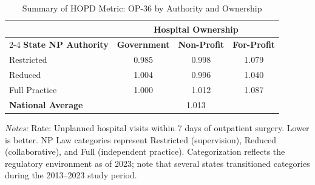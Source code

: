 \begin{table}[htbp]
    \centering
    \caption{Summary of HOPD Metric: OP-36 by Authority and Ownership}
    \label{tab:hopd_op_36}
    \vspace{0.2cm}
    \begin{tabular}{lccc}
        \toprule
        & \multicolumn{3}{c}{\textbf{Hospital Ownership}} \\
        \cmidrule(lr){2-4}
        \textbf{State NP Authority} & \textbf{Government} & \textbf{Non-Profit} & \textbf{For-Profit} \\
        \midrule
        Restricted & 0.985 & 0.998 & 1.079 \\
        Reduced & 1.004 & 0.996 & 1.040 \\
        Full Practice & 1.000 & 1.012 & 1.087 \\
        \midrule
        \textbf{National Average} & \multicolumn{3}{c}{1.013} \\
        \bottomrule
    \end{tabular}
    \vspace{0.1cm}
    \begin{minipage}{0.85\textwidth}
        \footnotesize \textit{Notes:} Rate: Unplanned hospital visits within 7 days of outpatient surgery. Lower is better. NP Law categories represent Restricted (supervision), Reduced (collaborative), and Full (independent practice). Categorization reflects the regulatory environment as of 2023; note that several states transitioned categories during the 2013--2023 study period.
    \end{minipage}
\end{table}